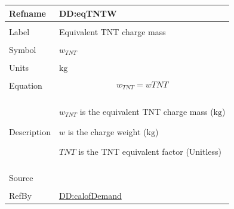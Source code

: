 \documentclass[12pt]{article}
\begin{document}
\vspace{\baselineskip}
\noindent
\begin{minipage}{\textwidth}
\begin{tabular}{>{\raggedright}p{}>{\raggedright\arraybackslash}p{}}
\toprule \textbf{Refname} & \textbf{DD:eqTNTW}
\label{DD:eqTNTW}
\\ \midrule \\
Label & Equivalent TNT charge mass
        
\\ \midrule \\
Symbol & ${w_{\mathit{TNT}}}$
         
\\ \midrule \\
Units & ${\text{kg}}$
        
\\ \midrule \\
Equation & \begin{displaymath}
           {w_{\mathit{TNT}}}=w \mathit{TNT}
           \end{displaymath}
\\ \midrule \\
Description & \begin{symbDescription}
              \item{${w_{\mathit{TNT}}}$ is the equivalent TNT charge mass (${\text{kg}}$)}
              \item{$w$ is the charge weight (${\text{kg}}$)}
              \item{$\mathit{TNT}$ is the TNT equivalent factor (Unitless)}
              \end{symbDescription}
\\ \midrule \\
Source & \cite{astm2009}
         
\\ \midrule \\
RefBy & \hyperref[DD:calofDemand]{DD:calofDemand}
        
\\ \bottomrule
\end{tabular}
\end{minipage}
\end{document}
